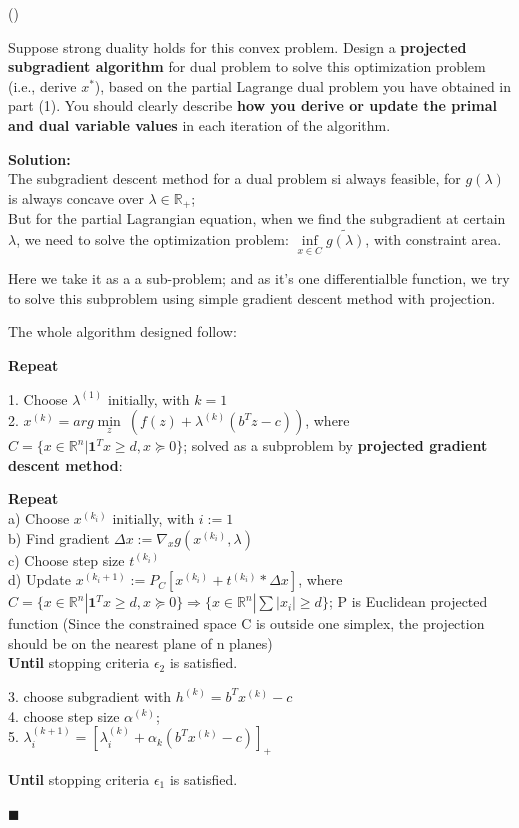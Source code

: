 \documentclass{article}
\newcounter{pcounter}                                   %
\newenvironment{problem}                                %
{                                                       %
    \stepcounter{pcounter}                              %
    (\arabic{pcounter})                                 %
}{}                                                     %
\newenvironment{solution}                               %
{\textbf{Solution:} \\}{$\blacksquare$\newline}         %
\newcommand{\domR}{\mathbb{R}}                          %
\newcommand{\vecOne}{\textbf{1}}                        %
\begin{document}
\begin{problem}
    Suppose strong duality holds for this convex problem. Design a \textbf{projected subgradient algorithm} for dual problem to solve this optimization problem (i.e., derive $x^*$), based on the partial Lagrange dual problem you have obtained in part (1). You should clearly describe \textbf{how you derive or update the primal and dual variable values} in each iteration of the algorithm.
\end{problem}

\begin{solution}
    The subgradient descent method for a dual problem si always feasible, for $g(\lambda)$ is always concave over $\lambda \in \domR_+$;\\
    But for the partial Lagrangian equation, when we find the subgradient at certain $\lambda$, we need to solve the optimization problem: $\inf\limits_{x \in C} \tilde{g(\lambda)}$, with constraint area.

    Here we take it as a a sub-problem; and as it's one differentialble function, we try to solve this subproblem using simple gradient descent method with projection.

    The whole algorithm designed follow:

    \textbf{Repeat}
    \begin{adjustwidth}{0.5cm}{}
        1. Choose $\lambda^{(1)}$ initially, with $k=1$ \\
        2. $x^{(k)} = arg\min\limits_z\ (f(z) + \lambda^{(k)} (b^Tz-c))$, where $C = \{x \in \domR^n | \vecOne^T x \geq d, x \succeq 0\}$; solved as a subproblem by \textbf{projected gradient descent method}:
        \begin{adjustwidth}{0.5cm}{}
            \textbf{Repeat}\\
            a) Choose $x^{(k_i)}$ initially, with $i:=1$ \\
            b) Find gradient $\Delta{x} := \nabla_x g(x^{(k_i)}, \lambda)$ \\
            c) Choose step size $t^{(k_i)}$\\
            d) Update $x^{(k_i+1)} := P_C [x^{(k_i)} + t^{(k_i)} * \Delta{x}]$, where $C = \{x \in \domR^n | \vecOne^T x \geq d, x \succeq 0\} \Rightarrow \{x \in \domR^n | \sum{|x_i|} \geq d\}$; P is Euclidean projected function (Since the constrained space C is outside one simplex, the projection should be on the nearest plane of n planes) \\
            \textbf{Until} stopping criteria $\epsilon_2$ is satisfied.
        \end{adjustwidth}
        3. choose subgradient with $h^{(k)} = b^T x^{(k)} - c$ \\
        4. choose step size $\alpha^{(k)}$; \\
        5. $\lambda_{i}^{(k+1)} = [\lambda_{i}^{(k)} + \alpha_k (b^T x^{(k)} - c)]_+ $
    \end{adjustwidth}
    \textbf{Until} stopping criteria $\epsilon_1$ is satisfied.

\end{solution}
\end{document}
